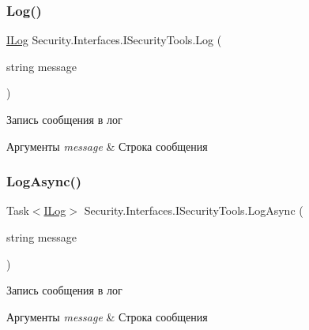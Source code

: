 \subsubsection{\texorpdfstring{Log()}{Log()}}
{\footnotesize\ttfamily \hyperlink{interface_security_1_1_interfaces_1_1_model_1_1_i_log}{I\+Log} Security.\+Interfaces.\+I\+Security\+Tools.\+Log (\begin{DoxyParamCaption}\item[{string}]{message }\end{DoxyParamCaption})}



Запись сообщения в лог 


\begin{DoxyParams}{Аргументы}
{\em message} & Строка сообщения\\
\hline
\end{DoxyParams}
\mbox{\label{interface_security_1_1_interfaces_1_1_i_security_tools_a43d1289cbb80b392be815479e48b9764}} 
\subsubsection{\texorpdfstring{Log\+Async()}{LogAsync()}}
{\footnotesize\ttfamily Task$<$\hyperlink{interface_security_1_1_interfaces_1_1_model_1_1_i_log}{I\+Log}$>$ Security.\+Interfaces.\+I\+Security\+Tools.\+Log\+Async (\begin{DoxyParamCaption}\item[{string}]{message }\end{DoxyParamCaption})}



Запись сообщения в лог 


\begin{DoxyParams}{Аргументы}
{\em message} & Строка сообщения\\
\hline
\end{DoxyParams}
\mbox{\label{interface_security_1_1_interfaces_1_1_i_security_tools_a102a74725900d13544f22353a239ed45}} 

